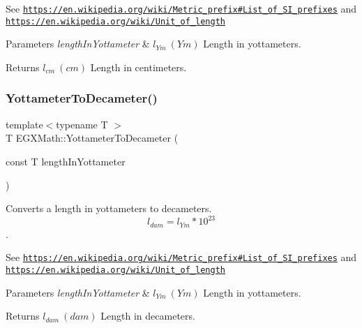 See \href{https://en.wikipedia.org/wiki/Metric_prefix#List_of_SI_prefixes}{\tt https\+://en.\+wikipedia.\+org/wiki/\+Metric\+\_\+prefix\#\+List\+\_\+of\+\_\+\+S\+I\+\_\+prefixes} and \href{https://en.wikipedia.org/wiki/Unit_of_length}{\tt https\+://en.\+wikipedia.\+org/wiki/\+Unit\+\_\+of\+\_\+length} 
\begin{DoxyParams}{Parameters}
{\em length\+In\+Yottameter} & $ l_{Ym}\ (Ym)$ Length in yottameters. \\
\hline
\end{DoxyParams}
\begin{DoxyReturn}{Returns}
$ l_{cm}\ (cm)$ Length in centimeters. 
\end{DoxyReturn}
\mbox{\label{group___e_g_x_math-_conversions-_length_conversions-_yottameter-_s_i_gadb4ab7fb7c1091124160d66ace6439a3}} 
\subsubsection{\texorpdfstring{Yottameter\+To\+Decameter()}{YottameterToDecameter()}}
{\footnotesize\ttfamily template$<$typename T $>$ \\
T E\+G\+X\+Math\+::\+Yottameter\+To\+Decameter (\begin{DoxyParamCaption}\item[{const T}]{length\+In\+Yottameter }\end{DoxyParamCaption})}



Converts a length in yottameters to decameters. \[ l_{dam}=l_{Ym} * 10^{23} \]. 

See \href{https://en.wikipedia.org/wiki/Metric_prefix#List_of_SI_prefixes}{\tt https\+://en.\+wikipedia.\+org/wiki/\+Metric\+\_\+prefix\#\+List\+\_\+of\+\_\+\+S\+I\+\_\+prefixes} and \href{https://en.wikipedia.org/wiki/Unit_of_length}{\tt https\+://en.\+wikipedia.\+org/wiki/\+Unit\+\_\+of\+\_\+length} 
\begin{DoxyParams}{Parameters}
{\em length\+In\+Yottameter} & $ l_{Ym}\ (Ym)$ Length in yottameters. \\
\hline
\end{DoxyParams}
\begin{DoxyReturn}{Returns}
$ l_{dam}\ (dam)$ Length in decameters. 
\end{DoxyReturn}
\mbox{\label{group___e_g_x_math-_conversions-_length_conversions-_yottameter-_s_i_ga8d80b66500f1ccc85839ec50b0ca8b0d}} 

